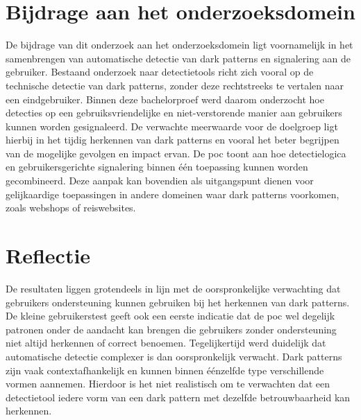 \vspace{1em}

\section{Bijdrage aan het onderzoeksdomein}
\label{sec:bijdrage-onderzoeksdomein}

\vspace{1em}

De bijdrage van dit onderzoek aan het onderzoeksdomein ligt voornamelijk in het samenbrengen van automatische detectie van dark patterns en signalering aan de gebruiker. Bestaand onderzoek naar detectietools richt zich vooral op de technische detectie van dark patterns, zonder deze rechtstreeks te vertalen naar een eindgebruiker. Binnen deze bachelorproef werd daarom onderzocht hoe detecties op een gebruiksvriendelijke en niet-verstorende manier aan gebruikers kunnen worden gesignaleerd. De verwachte meerwaarde voor de doelgroep ligt hierbij in het tijdig herkennen van dark patterns en vooral het beter begrijpen van de mogelijke gevolgen en impact ervan. De \acrshort{poc} toont aan hoe detectielogica en gebruikersgerichte signalering binnen één toepassing kunnen worden gecombineerd. Deze aanpak kan bovendien als uitgangspunt dienen voor gelijkaardige toepassingen in andere domeinen waar dark patterns voorkomen, zoals webshops of reiswebsites.

\vspace{1em}

\section{Reflectie}
\label{sec:reflectie}

\vspace{1em}

De resultaten liggen grotendeels in lijn met de oorspronkelijke verwachting dat gebruikers ondersteuning kunnen gebruiken bij het
herkennen van dark patterns. De kleine gebruikerstest geeft ook een eerste indicatie dat de \acrshort{poc} wel degelijk patronen onder de aandacht kan brengen die gebruikers zonder ondersteuning niet altijd herkennen of correct benoemen. Tegelijkertijd werd duidelijk dat automatische detectie complexer is dan oorspronkelijk verwacht. Dark patterns zijn vaak contextafhankelijk en kunnen binnen éénzelfde type verschillende vormen aannemen. Hierdoor is het niet realistisch om te verwachten dat een detectietool iedere vorm van een dark pattern met dezelfde betrouwbaarheid kan herkennen.

